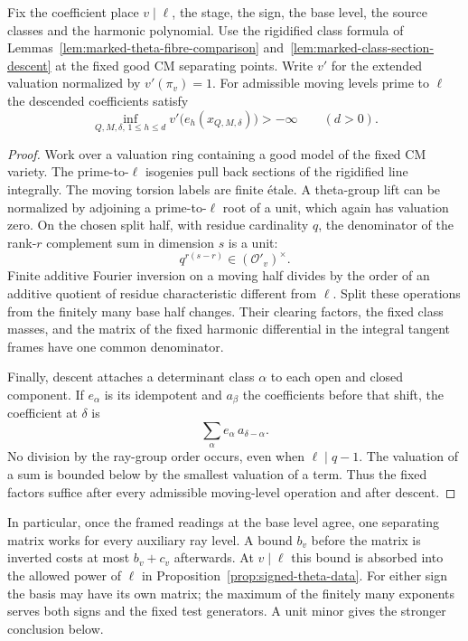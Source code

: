 \begin{auxlemma}\label{lem:marked-prime-to-level-denominator}
Fix the coefficient place \(v\mid\ell\), the stage, the sign,
the base level, the source classes and the harmonic polynomial.
Use the rigidified class formula of Lemmas~\ref{lem:marked-theta-fibre-comparison} and~\ref{lem:marked-class-section-descent} at the fixed good CM separating points. Write \(v'\) for the extended valuation
normalized by \(v'(\pi_v)=1\). For admissible moving levels prime
to \(\ell\) the descended coefficients satisfy
\[
             \inf_{Q,M,\delta,\,1\le h\le d}
                   v'\bigl(e_h(x_{Q,M,\delta})\bigr)>-\infty
                   \qquad(d>0).
\]
\end{auxlemma}
\begin{proof}
Work over a valuation ring containing a good model of the fixed
CM variety. The prime-to-\(\ell\) isogenies pull back sections of
the rigidified line integrally. The moving torsion labels are
finite \'etale. A theta-group lift can be normalized by adjoining
a prime-to-\(\ell\) root of a unit, which again has valuation
zero. On the chosen split half, with residue cardinality \(q\),
the denominator of the rank-\(r\) complement sum in dimension
\(s\) is a unit:
\[
                q^{r(s-r)}\in(\mathcal O'_v)^\times .
\]
Finite additive Fourier inversion on a moving half divides by
the order of an additive quotient of residue characteristic
different from \(\ell\). Split these operations from the finitely
many base half changes. Their clearing factors, the fixed class
masses, and the matrix of the fixed harmonic differential in the
integral tangent frames have one common denominator.

Finally, descent attaches a determinant class \(\alpha\) to
each open and closed component. If \(e_\alpha\) is its
idempotent and \(a_\beta\) the coefficients before that shift,
the coefficient at \(\delta\) is
\[
                      \sum_\alpha e_\alpha\,a_{\delta-\alpha}.
\]
No division by the ray-group order occurs, even when
\(\ell\mid q-1\). The valuation of a sum is bounded below by
the smallest valuation of a term. Thus the fixed factors suffice
after every admissible moving-level operation and after descent.
\end{proof}

In particular, once the framed readings at the base level agree,
one separating matrix works for every auxiliary ray level. A bound
\(b_v\) before the matrix is inverted costs at most \(b_v+c_v\)
afterwards. At \(v\mid\ell\) this bound is absorbed into the
allowed power of \(\ell\) in Proposition~\ref{prop:signed-theta-data}.
For either sign the basis may have its own matrix; the maximum of
the finitely many exponents serves both signs and the fixed test
generators. A unit minor gives the stronger conclusion below.

